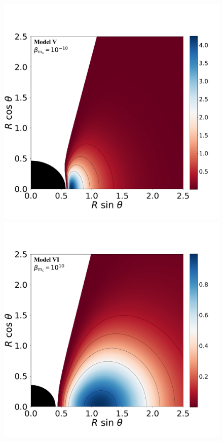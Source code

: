 \documentclass[twocolumn,aps,showpacs,showkeys,prd,superscriptaddress,byrevtex, amsmath]{revtex4-1}
\begin{document}
\begin{figure}
\hspace{-0.2cm}
\includegraphics[scale=0.14]{figures/fig4_V__10.pdf}
\\
\includegraphics[scale=0.14]{figures/fig4_VI_10.pdf}

\end{figure}
\end{document}
